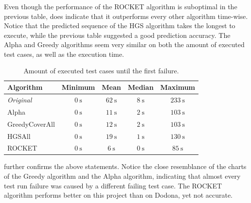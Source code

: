 \noindent Even though the performance of the ROCKET algorithm is suboptimal in the previous table,  does indicate that it outperforms every other algorithm time-wise. Notice that the predicted sequence of the HGS algorithm takes the longest to execute, while the previous table suggested a good prediction accuracy. The Alpha and Greedy algorithms seem very similar on both the amount of executed test cases, as well as the execution time.

\begin{table}[h]
	\centering
	\begin{tabularx}{\textwidth}{|X||c|c|c|c|}
		\hline
		\textbf{Algorithm} & \textbf{Minimum} & \textbf{Mean} & \textbf{Median} & \textbf{Maximum}\\
		
		\hline
		
		\emph{Original} & $\SI{0}{\second}$ & $\SI{62}{\second}$ & $\SI{8}{\second}$ & $\SI{233}{\second}$\\

		\hline
		
		Alpha & $\SI{0}{\second}$ & $\SI{11}{\second}$ & $\SI{2}{\second}$ & $\SI{103}{\second}$\\
		
		\hline
		
		GreedyCoverAll & $\SI{0}{\second}$ & $\SI{12}{\second}$ & $\SI{2}{\second}$ & $\SI{103}{\second}$\\
		
		\hline
		
		HGSAll & $\SI{0}{\second}$ & $\SI{19}{\second}$ & $\SI{1}{\second}$ & $\SI{130}{\second}$\\
		
		\hline
		
		ROCKET & $\SI{0}{\second}$ & $\SI{6}{\second}$ & $\SI{0}{\second}$ & $\SI{85}{\second}$\\
		
		\hline
	\end{tabularx}
	\caption{Amount of executed test cases until the first failure.}
	\label{tbl:rq5-first-failure-duration}
\end{table}

\noindent {} further confirms the above statements. Notice the close resemblance of the charts of the Greedy algorithm and the Alpha algorithm, indicating that almost every test run failure was caused by a different failing test case. The ROCKET algorithm performs better on this project than on Dodona, yet not accurate.

